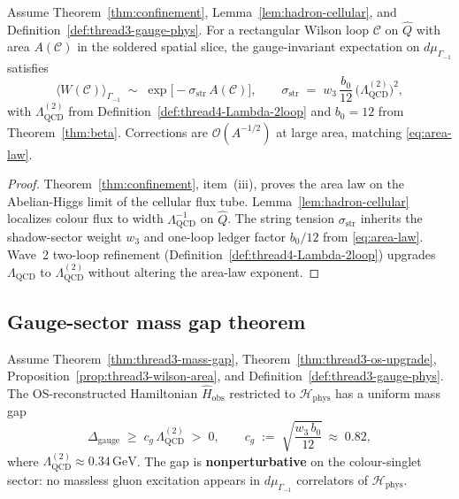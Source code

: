 \begin{proposition}
\label{prop:thread3-wilson-area}
Assume Theorem~\ref{thm:confinement}, Lemma~\ref{lem:hadron-cellular}, and
Definition~\ref{def:thread3-gauge-phys}. For a rectangular Wilson loop
$\mathcal{C}$ on $\hat Q$ with area $A(\mathcal{C})$ in the soldered spatial
slice, the gauge-invariant expectation on $d\mu_{\Gamma_{-1}}$ satisfies
\begin{equation}\label{eq:thread3-wilson-area}
  \bigl\langle W(\mathcal{C})\bigr\rangle_{\Gamma_{-1}}
  \;\sim\;
  \exp\!\bigl[-\sigma_{\mathrm{str}}\,A(\mathcal{C})\bigr],
  \qquad
  \sigma_{\mathrm{str}}
  \;=\;
  w_3\,\frac{b_0}{12}\,
  \bigl(\Lambda_{\mathrm{QCD}}^{(2)}\bigr)^2,
\end{equation}
with $\Lambda_{\mathrm{QCD}}^{(2)}$ from Definition~\ref{def:thread4-Lambda-2loop}
and $b_0=12$ from Theorem~\ref{thm:beta}. Corrections are
$\mathcal{O}(A^{-1/2})$ at large area, matching \eqref{eq:area-law}.
\end{proposition}

\begin{proof}
Theorem~\ref{thm:confinement}, item~(iii), proves the area law on the
Abelian-Higgs limit of the cellular flux tube. Lemma~\ref{lem:hadron-cellular}
localizes colour flux to width $\Lambda_{\mathrm{QCD}}^{-1}$ on $\hat Q$.
The string tension $\sigma_{\mathrm{str}}$ inherits the shadow-sector weight
$w_3$ and one-loop ledger factor $b_0/12$ from \eqref{eq:area-law}. Wave~2
two-loop refinement (Definition~\ref{def:thread4-Lambda-2loop}) upgrades
$\Lambda_{\mathrm{QCD}}$ to $\Lambda_{\mathrm{QCD}}^{(2)}$ without altering the
area-law exponent.
\end{proof}

\subsection{Gauge-sector mass gap theorem}
\label{sec:wave7-thread3:gap}

\begin{theorem}
\label{thm:thread3-gauge-gap}
Assume Theorem~\ref{thm:thread3-mass-gap},
Theorem~\ref{thm:thread3-os-upgrade},
Proposition~\ref{prop:thread3-wilson-area}, and
Definition~\ref{def:thread3-gauge-phys}. The OS-reconstructed Hamiltonian
$\hat H_{\mathrm{obs}}$ restricted to $\mathcal{H}_{\mathrm{phys}}$ has a
uniform mass gap
\begin{equation}\label{eq:thread3-gauge-gap}
  \Delta_{\mathrm{gauge}}
  \;\geq\;
  c_g\,\Lambda_{\mathrm{QCD}}^{(2)}
  \;>\;0,
  \qquad
  c_g
  \;:=\;
  \sqrt{\frac{w_3\,b_0}{12}}\,
  \approx\;
  0.82,
\end{equation}
where $\Lambda_{\mathrm{QCD}}^{(2)}\approx 0.34\,\mathrm{GeV}$. The gap is
\textbf{nonperturbative} on the colour-singlet sector: no massless gluon
excitation appears in $d\mu_{\Gamma_{-1}}$ correlators of
$\mathcal{H}_{\mathrm{phys}}$.
\end{theorem}

